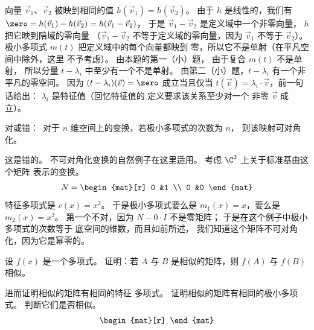 \begin{exercises}
\begin{answer}
\begin{exparts}
          向量 $\vec{v}_1$、$\vec{v}_2$ 被映到相同的值
          $h(\vec{v}_1)=h(\vec{v}_2)$。
          由于 $h$ 是线性的，我们有
          $\zero=h(\vec{v}_1)-h(\vec{v}_2)=h(\vec{v}_1-\vec{v}_2)$，
          于是 $\vec{v}_1-\vec{v}_2$ 是定义域中一个非零向量，
          $h$ 把它映到陪域的零向量  
          （$\vec{v}_1-\vec{v}_2$
          不等于定义域的零向量，因为 $\vec{v}_1$
          不等于 $\vec{v}_2$）。
        \partsitem 极小多项式 
          $m(t)$ 把定义域中的每个向量都映到 
          零，所以它不是单射（在平凡空间中除外，这里 
          不予考虑）。
          由本题的第一（小）题， 
          由于复合 $m(t)$ 不是单射，
          所以分量 $t-\lambda_i$ 中至少有一个不是单射。
          由第二（小）题，$t-\lambda_i$ 有一个非平凡的零空间。
          因为 $(t-\lambda_i)(\vec{v})=\zero$ 成立当且仅当
          $t(\vec{v})=\lambda_i\cdot\vec{v}$，前一句话给出：
          $\lambda_i$ 是特征值（回忆特征值的
          定义要求该关系至少对一个
          非零 $\vec{v}$ 成立）。
      \end{exparts}
    \end{answer}
  \item 
    对或错：~对于 \( n \) 维空间上的变换，若极小多项式的次数为 \( n \)， 
    则该映射可对角化。
    \begin{answer}
      这是错的。
      不可对角化变换的自然例子在这里适用。
      考虑 $\C^2$ 上关于标准基由这个矩阵
      表示的变换。
      \begin{equation*}
        N=
        \begin{mat}[r]
          0  &1  \\
          0  &0
        \end{mat}
      \end{equation*}
      特征多项式是 $c(x)=x^2$。 
      于是极小多项式要么是 $m_1(x)=x$，要么是 $m_2(x)=x^2$。
      第一个不对，因为 $N-0\cdot I$ 不是零矩阵；
      于是在这个例子中极小多项式的次数等于 
      底空间的维数，而且如前所述，
      我们知道这个矩阵不可对角化，因为它是幂零的。 
    \end{answer}
   \item 
     设 $f(x)$ 是一个多项式。
     证明：若 $A$ 与 $B$ 是相似的矩阵，则 $f(A)$ 与 
     $f(B)$ 相似。
     \begin{exparts}
       \partsitem 进而证明相似的矩阵有相同的特征
         多项式。
       \partsitem 证明相似的矩阵有相同的极小多项式。
       \partsitem 判断它们是否相似。
          \begin{equation*}
            \begin{mat}[r]

\end{mat}
\end{equation*}
\end{exparts}
\end{exercises}
